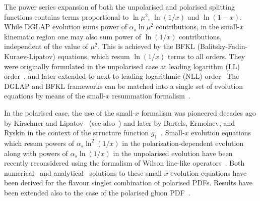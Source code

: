 The power series expansion of both the unpolarised and polarised 
splitting functions contains terms proportional to $\ln\mu^2$, 
$\ln(1/x)$ and $\ln(1-x)$.
%
While DGLAP evolution sums power of $\alpha_s\ln\mu^2$ contributions,
in the small-$x$ kinematic region one may also sum power of $\ln(1/x)$
contributions, independent of the value of $\mu^2$.
%
This is achieved by the BFKL (Balitsky-Fadin-Kuraev-Lipatov) equations,
which resum $\ln(1/x)$ terms to all orders.
%
They were originally formulated in the unpolarised case at leading logarithm 
(LL) order~\cite{Fadin:1975cb,Kuraev:1976ge,Kuraev:1977fs,Balitsky:1978ic},
and later extended to next-to-leading logarithmic (NLL) 
order~\cite{Fadin:1998py,Camici:1997ij,Ciafaloni:1998gs}
%
The DGLAP and BFKL frameworks can be matched into a single set of evolution 
equations by means of the small-$x$ resummation
formalism~\cite{Ciafaloni:1999yw,Ciafaloni:2000cb,Ciafaloni:2003ek,
Ciafaloni:2003rd,Altarelli:2005ni,White:2006yh,Altarelli:2008aj,
Ciafaloni:2007gf,Bonvini:2016wki}.

In the polarised case, the use of the small-$x$ formalism was pioneered 
decades ago by Kirschner and Lipatov~\cite{Kirschner:1983di} 
(see also~\cite{Kirschner:1994rq,Kirschner:1994vc,Griffiths:1999dj}) 
and later by Bartels, Ermolaev, and Ryskin in the context of the structure 
function $g_1$~\cite{Bartels:1995iu,Bartels:1996wc}.
%
Small-$x$ evolution equations which resum powers of $\alpha_s\ln^2(1/x)$ 
in the polarisation-dependent evolution along with powers of $\alpha_s\ln(1/x)$
in the unpolarised evolution have been recently reconsidered using the 
formalism of Wilson line-like operators~\cite{Kovchegov:2015pbl}.
%
Both numerical~\cite{Kovchegov:2016weo}
and analytical~\cite{Kovchegov:2016zex,Kovchegov:2017jxc}
solutions to these small-$x$ evolution equations have been derived
for the flavour singlet combination of polarised PDFs.
%
Results have been extended also to the case of the polarised gluon 
PDF~\cite{Kovchegov:2017lsr}.
